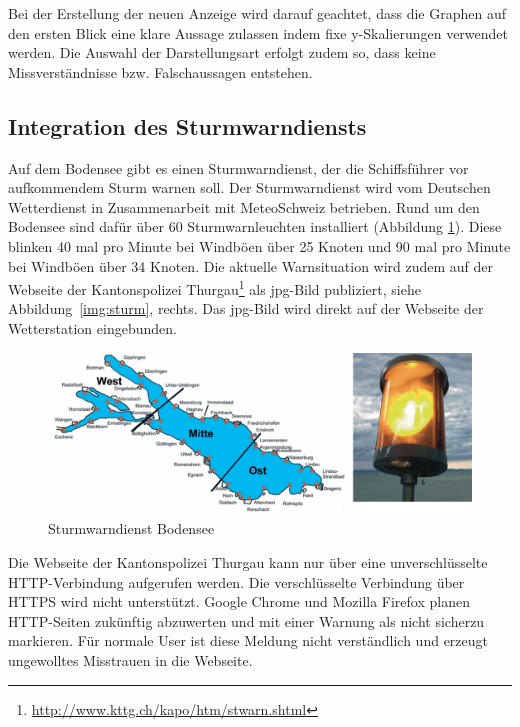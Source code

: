 \noindent
Bei der Erstellung der neuen Anzeige wird darauf geachtet, dass die Graphen auf den ersten Blick eine klare Aussage zulassen indem fixe y-Skalierungen verwendet werden. Die Auswahl der Darstellungsart erfolgt zudem so, dass keine Missverständnisse bzw. Falschaussagen entstehen.



\subsection{Integration des Sturmwarndiensts}
\label{subsec:sturmwarnung}

Auf dem Bodensee gibt es einen Sturmwarndienst, der die Schiffsführer vor aufkommendem Sturm warnen soll. Der Sturmwarndienst wird vom Deutschen Wetterdienst in Zusammenarbeit mit MeteoSchweiz betrieben. Rund um den Bodensee sind dafür über 60 Sturmwarnleuchten installiert (Abbildung \ref{img:sturm2}). Diese blinken 40 mal pro Minute bei Windböen  über 25 Knoten und 90 mal pro Minute bei Windböen über 34 Knoten. Die aktuelle Warnsituation wird zudem auf der Webseite der Kantonspolizei Thurgau\footnote{ \url{http://www.kttg.ch/kapo/htm/stwarn.shtml}} als jpg-Bild publiziert, siehe Abbildung~\ref{img:sturm}, rechts. Das jpg-Bild wird direkt auf der Webseite der Wetterstation eingebunden.
\newline

\begin{figure}[h!]
	\centering
	\includegraphics[width=1\linewidth]{img/sturm2}
	\caption{Sturmwarndienst Bodensee}
	\label{img:sturm2}
\end{figure}

\noindent
Die Webseite der Kantonspolizei Thurgau kann nur über eine unverschlüsselte HTTP-Verbindung aufgerufen werden. Die verschlüsselte Verbindung über HTTPS wird nicht unterstützt. Google Chrome und Mozilla Firefox planen HTTP-Seiten zukünftig abzuwerten und mit einer Warnung als \flqq nicht sicher\frqq zu markieren\cite{Chromium:marking-http-as-non-secure}\cite{Mozilla:DeprecatingNon-SecureHTTP}. Für normale User ist diese Meldung nicht verständlich und erzeugt ungewolltes Misstrauen in die Webseite. 


